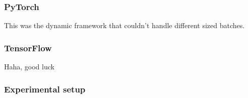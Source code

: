 \subsubsection*{PyTorch}

This was the dynamic framework that couldn't handle different sized batches.


\subsubsection*{TensorFlow}

Haha, good luck



\subsubsection{Experimental setup}


\pagebreak
